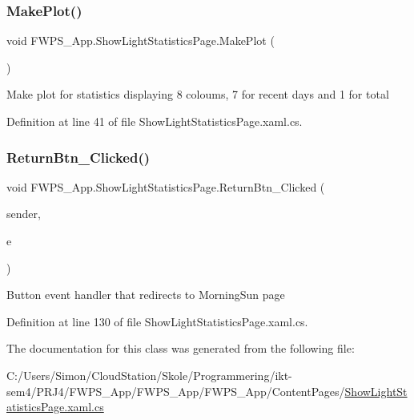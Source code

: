 \subsubsection{\texorpdfstring{Make\+Plot()}{MakePlot()}}
{\footnotesize\ttfamily void F\+W\+P\+S\+\_\+\+App.\+Show\+Light\+Statistics\+Page.\+Make\+Plot (\begin{DoxyParamCaption}{ }\end{DoxyParamCaption})}

Make plot for statistics displaying 8 coloums, 7 for recent days and 1 for total 

Definition at line 41 of file Show\+Light\+Statistics\+Page.\+xaml.\+cs.

\mbox{\label{class_f_w_p_s___app_1_1_show_light_statistics_page_acac747b108b4e06beee029b036b38195}} 
\subsubsection{\texorpdfstring{Return\+Btn\+\_\+\+Clicked()}{ReturnBtn\_Clicked()}}
{\footnotesize\ttfamily void F\+W\+P\+S\+\_\+\+App.\+Show\+Light\+Statistics\+Page.\+Return\+Btn\+\_\+\+Clicked (\begin{DoxyParamCaption}\item[{object}]{sender,  }\item[{Event\+Args}]{e }\end{DoxyParamCaption})\hspace{0.3cm}{\ttfamily [private]}}

Button event handler that redirects to Morning\+Sun page 

Definition at line 130 of file Show\+Light\+Statistics\+Page.\+xaml.\+cs.



The documentation for this class was generated from the following file\+:\begin{DoxyCompactItemize}
\item 
C\+:/\+Users/\+Simon/\+Cloud\+Station/\+Skole/\+Programmering/ikt-\/sem4/\+P\+R\+J4/\+F\+W\+P\+S\+\_\+\+App/\+F\+W\+P\+S\+\_\+\+App/\+F\+W\+P\+S\+\_\+\+App/\+Content\+Pages/\mbox{\hyperlink{_show_light_statistics_page_8xaml_8cs}{Show\+Light\+Statistics\+Page.\+xaml.\+cs}}\end{DoxyCompactItemize}
